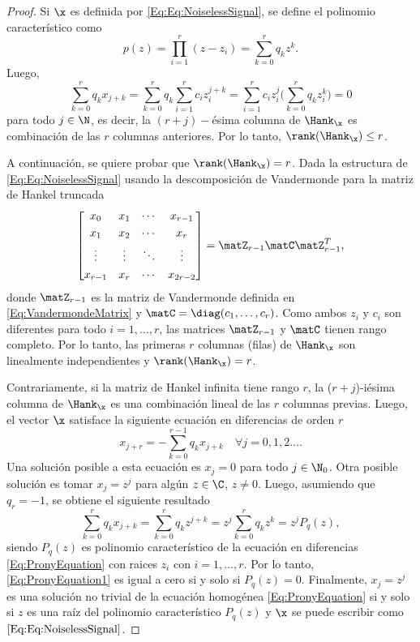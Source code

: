	\begin{proof}
		Si $\x$ es definida por \eqref{Eq:Eq:NoiselessSignal}, se define el polinomio característico como
		\begin{equation}
			p(z) = \prod_{i=1}^{r}(z-z_i) = \sum_{k=0}^{r} q_kz^k.
			\label{Eq:CharacteristicPolynomial}
		\end{equation}	
		Luego,
		\begin{equation}
			\sum_{k=0}^{r}q_kx_{j+k} = \sum_{k=0}^rq_k\sum_{i=1}^{r}c_iz_i^{j+k} = \sum_{i=1}^{r}c_iz_i^j\bigg(\sum_{k=0}^{r}q_kz_i^k\bigg) = 0
		\end{equation}
		para todo $j\in\N$, es decir, la $(r+j)-$ésima columna de $\Hank_{\x}$ es combinación de las $r$ columnas anteriores. Por lo tanto, $\rank(\Hank_{\x})\le r$. 
	
		A continuación, se quiere probar que $\rank(\Hank_{\x}) = r$. Dada la estructura de \eqref{Eq:Eq:NoiselessSignal} usando la descomposición de Vandermonde para la matriz de Hankel truncada
		\[\begin{bmatrix} x_0 & x_1 & \cdots & x_{r-1}\\[0.3em] x_1 & x_2 & \cdots & x_r\\[0.3em] \vdots & \vdots & \ddots & \vdots\\[0.3em] x_{r-1} & x_r & \cdots & x_{2r-2}
		\end{bmatrix} = \matZ_{r-1}\matC\matZ_{r-1}^T,\]
		donde $\matZ_{r-1}$ es la matriz de Vandermonde definida en \eqref{Eq:VandermondeMatrix} y $\matC = \diag(c_1,\ldots,c_r)$. Como ambos $z_i$ y $c_i$ son diferentes para todo $i=1,\ldots,r$, las matrices $\matZ_{r-1}$ y $\matC$ tienen rango completo. Por lo tanto, las primeras $r$ columnas (filas) de $\Hank_{\x}$ son linealmente independientes y $\rank(\Hank_{\x}) = r$. 	
	
		Contrariamente, si la matriz de Hankel infinita tiene rango $r$, la  ($r+j$)-iésima columna de $\Hank_{\x}$ es una combinación lineal de las $r$ columnas previas. Luego, el vector $\x$ satisface la siguiente ecuación en diferencias de orden $r$					
		\begin{equation}
			x_{j+r}= -\sum_{k=0}^{r-1} q_kx_{j+k} \quad \forall j=0,1,2\ldots.
			\label{Eq:PronyEquation} 
		\end{equation}
		Una solución posible a esta ecuación es $x_j=0$ para todo $j\in\N_0$. Otra posible solución es  tomar $x_j=z^j$ para algún $z\in\C$, $z\neq 0$. Luego, asumiendo que $q_r=-1$, se obtiene el siguiente resultado
		\begin{equation}
			\sum_{k=0}^{r}q_kx_{j+k} = \sum_{k=0}^rq_kz^{j+k} = z^j\sum_{k=0}^{r}q_kz^k = z^jP_q(z),
			\label{Eq:PronyEquation1}
		\end{equation}
		siendo $P_q(z)$ es polinomio característico de la ecuación en diferencias \eqref{Eq:PronyEquation} con raices $z_i$ con $i=1,\ldots,r$. Por lo tanto, \eqref{Eq:PronyEquation1} es igual a cero si y solo si $P_q(z) = 0$. Finalmente, $x_j=z^j$ es una solución no trivial de la ecuación homogénea \eqref{Eq:PronyEquation} si y solo si $z$ es una raíz del polinomio característico $P_q(z)$ y $\x$ se puede escribir como $\eqref{Eq:Eq:NoiselessSignal}$.
	\end{proof}

